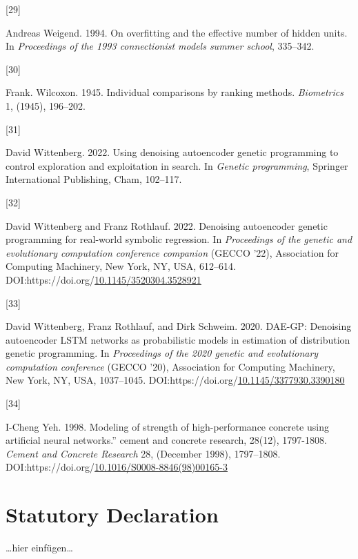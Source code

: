 \documentclass[
  11pt,
]{article}
\newlength{\cslhangindent}
\newlength{\csllabelwidth}
\newlength{\cslentryspacingunit} %
\newenvironment{CSLReferences}[2] %
 {%
  \setlength{\parindent}{0pt}
  \ifodd #1
  \let\oldpar\par
  \def\par{\hangindent=\cslhangindent\oldpar}
  \fi
  \setlength{\parskip}{#2\cslentryspacingunit}
 }%
 {}
\newcommand{\CSLLeftMargin}[1]{\parbox[t]{\csllabelwidth}{#1}}
\newcommand{\CSLRightInline}[1]{\parbox[t]{\linewidth - \csllabelwidth}{#1}\break}
\begin{document}
\begin{CSLReferences}{0}{0}
\leavevmode{}%
\CSLLeftMargin{{[}29{]} }%
\CSLRightInline{Andreas Weigend. 1994. On overfitting and the effective number of hidden units. In \emph{Proceedings of the 1993 connectionist models summer school}, 335--342.}

\leavevmode{}%
\CSLLeftMargin{{[}30{]} }%
\CSLRightInline{Frank. Wilcoxon. 1945. Individual comparisons by ranking methods. \emph{Biometrics} 1, (1945), 196--202.}

\leavevmode{}%
\CSLLeftMargin{{[}31{]} }%
\CSLRightInline{David Wittenberg. 2022. Using denoising autoencoder genetic programming to control exploration and exploitation in search. In \emph{Genetic programming}, Springer International Publishing, Cham, 102--117.}

\leavevmode{}%
\CSLLeftMargin{{[}32{]} }%
\CSLRightInline{David Wittenberg and Franz Rothlauf. 2022. Denoising autoencoder genetic programming for real-world symbolic regression. In \emph{Proceedings of the genetic and evolutionary computation conference companion} (GECCO '22), Association for Computing Machinery, New York, NY, USA, 612--614. DOI:https://doi.org/\href{https://doi.org/10.1145/3520304.3528921}{10.1145/3520304.3528921}}

\leavevmode{}%
\CSLLeftMargin{{[}33{]} }%
\CSLRightInline{David Wittenberg, Franz Rothlauf, and Dirk Schweim. 2020. DAE-GP: Denoising autoencoder LSTM networks as probabilistic models in estimation of distribution genetic programming. In \emph{Proceedings of the 2020 genetic and evolutionary computation conference} (GECCO '20), Association for Computing Machinery, New York, NY, USA, 1037--1045. DOI:https://doi.org/\href{https://doi.org/10.1145/3377930.3390180}{10.1145/3377930.3390180}}

\leavevmode{}%
\CSLLeftMargin{{[}34{]} }%
\CSLRightInline{I-Cheng Yeh. 1998. Modeling of strength of high-performance concrete using artificial neural networks.'' cement and concrete research, 28(12), 1797-1808. \emph{Cement and Concrete Research} 28, (December 1998), 1797--1808. DOI:https://doi.org/\href{https://doi.org/10.1016/S0008-8846(98)00165-3}{10.1016/S0008-8846(98)00165-3}}

\end{CSLReferences}

\newpage

\hypertarget{IV}{%
\section*{Statutory Declaration}\label{IV}}

\ldots hier einfügen\ldots{}
\end{document}
